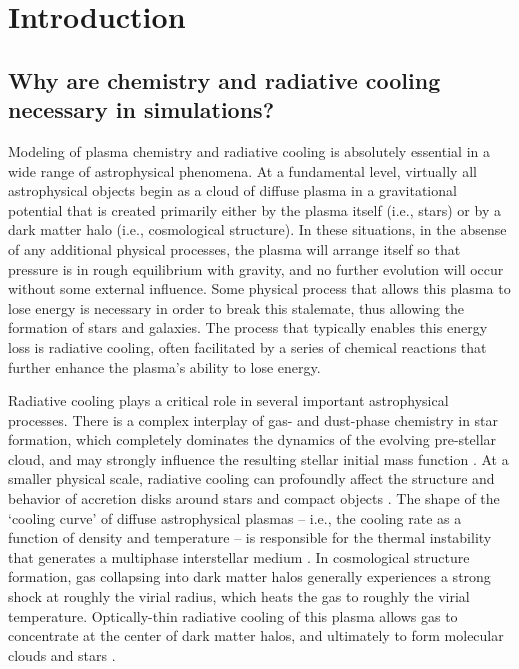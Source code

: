 \section{Introduction} \label{sec:intro}

\subsection{Why are chemistry and radiative cooling necessary in
  simulations?}

Modeling of plasma chemistry and radiative cooling is absolutely
essential in a wide range of astrophysical phenomena.  At a
fundamental level, virtually all astrophysical objects begin as a
cloud of diffuse plasma in a gravitational potential that is created
primarily either by the plasma itself (i.e., stars) or by a dark
matter halo (i.e., cosmological structure).  In these situations, in
the absense of any additional physical processes, the plasma will
arrange itself so that pressure is in rough equilibrium with gravity,
and no further evolution will occur without some external influence.
Some physical process that allows this plasma to lose energy is
necessary in order to break this stalemate, thus allowing the
formation of stars and galaxies.  The process that typically enables
this energy loss is radiative cooling, often facilitated by a series
of chemical reactions that further enhance the plasma's ability to
lose energy.

Radiative cooling plays a critical role in several important
astrophysical processes.  There is a complex interplay of gas- and
dust-phase chemistry in star formation, which completely dominates the
dynamics of the evolving pre-stellar cloud, and may strongly influence
the resulting stellar initial mass function
\citep{2002Sci...295...93A, 2011ApJ...726...55T,
2008AIPC..990...25G}. At 
a smaller physical scale, radiative cooling can profoundly affect the
structure and behavior of accretion disks around stars and compact
objects \citep{1973A&A....24..337S}. The shape of the `cooling curve'
of diffuse astrophysical plasmas -- i.e., the cooling rate as a
function of density and temperature -- is responsible for the thermal
instability that generates a multiphase interstellar medium
\citep{1977ApJ...218..148M, 1978ppim.book.....S}.  In cosmological
structure formation, gas collapsing into dark matter halos generally
experiences a strong shock at roughly the virial radius, which heats
the gas to roughly the virial temperature.  Optically-thin radiative
cooling of this plasma allows gas to concentrate at the center of dark
matter halos, and ultimately to form molecular clouds and stars
\citep{1977MNRAS.179..541R, 1991ApJ...379...52W}.

